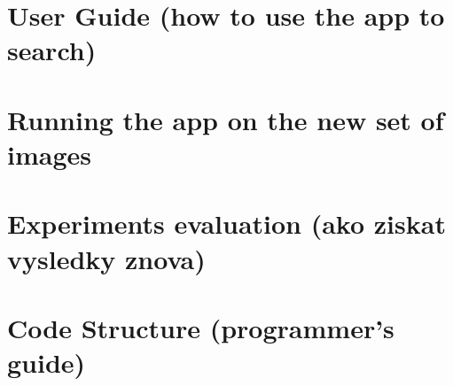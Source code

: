 \chapter{User Guide (how to use the app to search)}
\chapter{ Running the app on the new set of images}
\chapter{Experiments evaluation (ako ziskat vysledky znova)}
\chapter{Code Structure (programmer's guide)}





